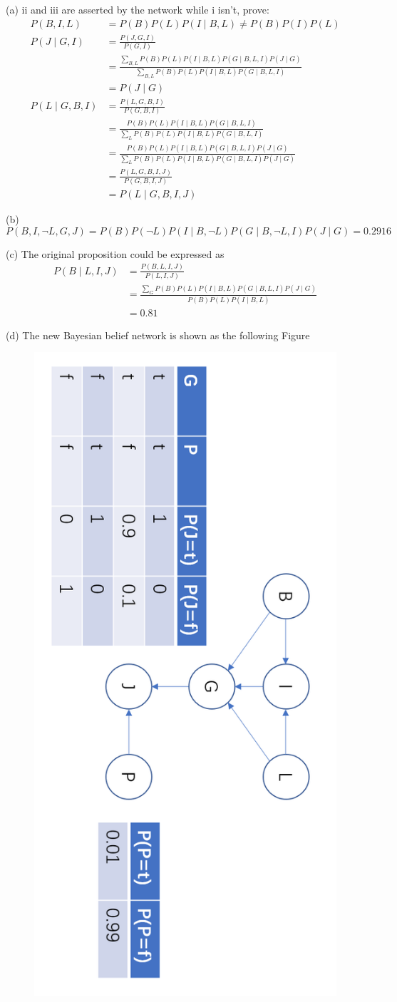 \documentclass{article}
\begin{document}
(a) ii and iii are asserted by the network while i isn't, prove:
\begin{align*}
    P(B, I, L) &= P(B)P(L)P(I \mid B, L) \ne P(B)P(I)P(L) \\[5mm]
    P(J \mid G, I) &= \frac{P(J, G, I)}{P(G, I)} \\[5mm]
    &= \frac{\sum_{B, L} P(B)P(L)P(I \mid B, L)P(G \mid B, L, I)P(J \mid G)}
            {\sum_{B, L} P(B)P(L)P(I \mid B, L)P(G \mid B, L, I)} \\[5mm]
    &= P(J \mid G) \\[5mm]
    P(L \mid G, B, I) &= \frac{P(L, G, B, I)}{P(G, B, I)} \\[5mm]
    &= \frac{P(B)P(L)P(I \mid B, L)P(G \mid B, L, I)}{\sum_{L} P(B)P(L)P(I \mid B, L)P(G \mid B, L, I)} \\[5mm]
    &= \frac{P(B)P(L)P(I \mid B, L)P(G \mid B, L, I)P(J \mid G)}
    {\sum_{L} P(B)P(L)P(I \mid B, L)P(G \mid B, L, I)P(J \mid G)} \\[5mm]
    &= \frac{P(L, G, B, I, J)}{P(G, B, I, J)} \\[5mm]
    &= P(L \mid G, B, I, J)
\end{align*}

(b)
$$
P(B, I, \neg L, G, J) = P(B)P(\neg L)P(I \mid B, \neg L)P(G \mid B, \neg L, I)P(J \mid G) = 0.2916
$$

(c) The original proposition could be expressed as
\begin{align*}
P(B \mid L, I, J) &= \frac{P(B, L, I, J)}{P(L, I, J)} \\[5mm]
&= \frac{\sum_{G} P(B)P(L)P(I \mid B, L)P(G \mid B, L, I)P(J \mid G)}{P(B)P(L)P(I \mid B, L)} \\[5mm]
&= 0.81
\end{align*}

(d) The new Bayesian belief network is shown as the following Figure
\begin{figure}[htbp]
\centering
\includegraphics[width=0.5\linewidth]{Bayesian Brief Network.png}
\end{figure}
\end{document}
